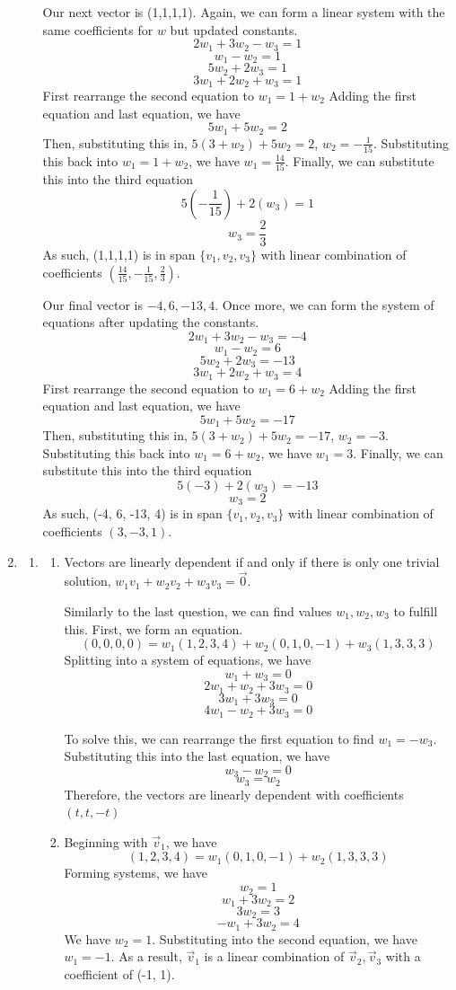 \documentclass[11pt, letterpaper, twoside]{article}
\begin{document}
\begin{enumerate}
\begin{enumerate}[label=\alph*)]
\vspace{1cm}
Our next vector is (1,1,1,1). 
Again, we can form a linear system with the same coefficients for \(w\) but updated constants.
\[2w_1+3w_2-w_3=1\]
\[w_1-w_2=1\]
\[5w_2+2w_3=1\]
\[3w_1+2w_2+w_3=1\]
First rearrange the second equation to \(w_1=1+w_2\)
Adding the first equation and last equation, we have 
\[5w_1+5w_2=2\]
Then, substituting this in, \(5(3+w_2)+5w_2=2\), \(w_2=-\frac{1}{15}\). 
Substituting this back into \(w_1=1+w_2\), we have \(w_1=\frac{14}{15}\).
Finally, we can substitute this into the third equation 
\[5(-\frac{1}{15})+2(w_3)=1\]
\[w_3=\frac{2}{3}\]
As such, (1,1,1,1) is in span \(\{v_1, v_2, v_3\}\) with linear combination of coefficients \(\left(\frac{14}{15}, -\frac{1}{15}, \frac{2}{3}\right)\).

\vspace{1cm}
Our final vector is \(-4, 6, -13, 4\). Once more, we can form the system of equations after updating the constants.
\[2w_1+3w_2-w_3=-4\]
\[w_1-w_2=6\]
\[5w_2+2w_3=-13\]
\[3w_1+2w_2+w_3=4\]
First rearrange the second equation to \(w_1=6+w_2\)
Adding the first equation and last equation, we have 
\[5w_1+5w_2=-17\]
Then, substituting this in, \(5(3+w_2)+5w_2=-17\), \(w_2=-3\). 
Substituting this back into \(w_1=6+w_2\), we have \(w_1=3\).
Finally, we can substitute this into the third equation 
\[5(-3)+2(w_3)=-13\]
\[w_3=2\]
As such, (-4, 6, -13, 4) is in span \(\{v_1, v_2, v_3\}\) with linear combination of coefficients \(\left(3,-3,1\right)\).
\end{enumerate}
\item
\begin{enumerate}[label=\alph*)]
\item \begin{enumerate}[label=\roman*)]
\item Vectors are linearly dependent if and only if there is only one trivial solution, \(w_1v_1+w_2v_2+w_3v_3=\vec 0\).

Similarly to the last question, we can find values \(w_1, w_2, w_3\) to fulfill this. First, we form an equation.
\[(0,0,0,0)=w_1(1,2,3,4)+w_2(0,1,0,-1)+w_3(1,3,3,3)\]
Splitting into a system of equations, we have 
\[w_1+w_3=0\]
\[2w_1+w_2+3w_3=0\]
\[3w_1+3w_3=0\]
\[4w_1-w_2+3w_3=0\]

To solve this, we can rearrange the first equation to find \(w_1=-w_3\).
Substituting this into the last equation, we have 
\[w_3-w_2=0\]
\[w_3=w_2\]
Therefore, the vectors are linearly dependent with coefficients \((t, t, -t)\)
\item Beginning with \(\vec v_1\), we have 
\[(1,2,3,4)=w_1(0,1,0,-1)+w_2(1,3,3,3)\]
Forming systems, we have 
\[w_2=1\]
\[w_1+3w_2=2\]
\[3w_2=3\]
\[-w_1+3w_2=4\]
We have \(w_2=1\). Substituting into the second equation, we have \(w_1=-1\).
As a result, \(\vec v_1\) is a linear combination of \(\vec v_2, \vec v_3\) with a coefficient of (-1, 1).


\end{enumerate}
\end{enumerate}
\end{enumerate}
\end{document}

